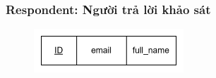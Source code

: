 \subsubsection{Respondent: Người trả lời khảo sát}
\begin{center}
        \begin{table}[H]
                \def\arraystretch{2}%
                \caption{Thực thể Respondent}
        \end{table}
\end{center}
\begin{figure}[H]
        \centering
        \includegraphics[width=0.5\textwidth]{Content/Phân tích và thiết kế hệ thống/images/ERD_mapping/respondent_mapping.png}
        \label{fig:Thực thể Respondent}
\end{figure}

